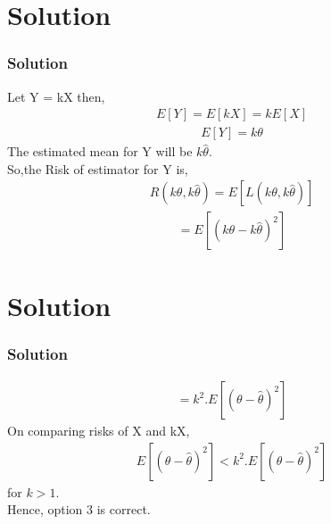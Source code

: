 \documentclass{beamer}
\begin{document}
\section{Solution}
\begin{frame}
\frametitle{Solution}
Let Y = kX then,
\begin{align}
    E[Y] = E[kX] = kE[X]
\end{align}
\begin{align}
    E[Y] = k\theta
\end{align}
The estimated mean for Y will be $k\hat{\theta}$.\\
So,the Risk of estimator for Y is,
\begin{align}
    R(k\theta,k\hat{\theta}) = E[L(k\theta,k\hat{\theta})]
\end{align}
\begin{align}
    = E[(k\theta - k\hat{\theta})^2] 
\end{align}
\end{frame}

\section{Solution}
\begin{frame}
\frametitle{Solution}
\begin{align}
    = k^2.E[(\theta - \hat{\theta})^2] 
\end{align}
On comparing risks of X and kX,
\begin{align}
   E[(\theta - \hat{\theta})^2] < k^2.E[(\theta - \hat{\theta})^2]
\end{align}
for $k>1$.\\
Hence, option 3 is correct.
\end{frame}
\end{document}
